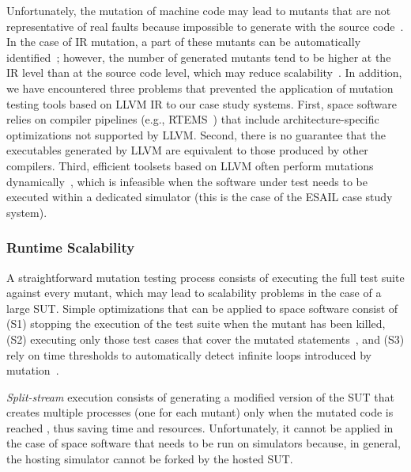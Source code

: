 Unfortunately, the mutation of machine code 
may lead to mutants that are not representative of real faults because impossible to generate with the source code~\cite{schuler2009efficient}.
In the case of IR mutation, a part of these mutants can be automatically identified~\cite{denisov2018mull}; however,
the number of generated mutants tend to be higher at the IR level than at the source code level, which may reduce scalability~\cite{hariri2019comparing}.
 In addition, we have encountered three problems that prevented the application of 
 mutation testing tools based on  LLVM IR to our case study systems.
First, space software relies on compiler pipelines (e.g., RTEMS~\cite{RTEMS}) that include architecture-specific optimizations not supported by LLVM. 
Second, there is no guarantee that the executables generated by LLVM are equivalent to those produced by other compilers.
 Third, efficient toolsets based on LLVM often  perform mutations dynamically~\cite{denisov2018mull}, which is infeasible when the software under test needs to be executed within a dedicated simulator (this is the case of the ESAIL case study system).




\subsubsection{Runtime Scalability}
\label{sec:scalability}

A straightforward mutation testing process consists of executing the full test suite against every mutant, which may lead to scalability problems in the case of a large SUT.
Simple optimizations that can be applied to space software consist of (S1) stopping the execution of the test suite when the mutant has been killed, (S2) executing only those test cases that cover the mutated statements~\cite{delamaro1996proteum}, and (S3) rely on time thresholds to automatically detect infinite loops introduced by mutation~\cite{papadakis2019mutation}. 

\emph{Split-stream} execution consists of generating a modified version of the SUT that creates multiple processes (one for each mutant) only when the mutated code is reached \cite{king1991fortran,tokumoto2016muvm}, thus saving time and resources. Unfortunately, it cannot be applied in the case of space software that needs to be run on simulators because, in general, the hosting simulator cannot be forked by the hosted SUT.

